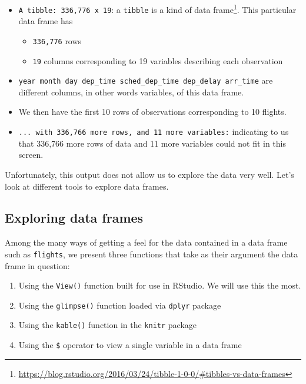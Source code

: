 \documentclass[12pt,]{krantz}
\providecommand{\tightlist}{%
  \setlength{\itemsep}{0pt}\setlength{\parskip}{0pt}}
\renewcommand{\href}[2]{#2\footnote{\url{#1}}}
\begin{document}
\begin{itemize}
\tightlist
\item
  \texttt{A\ tibble:\ 336,776\ x\ 19}: a \texttt{tibble} is a
  \href{https://blog.rstudio.org/2016/03/24/tibble-1-0-0/\#tibbles-vs-data-frames}{kind
  of data frame}. This particular data frame has

  \begin{itemize}
  \tightlist
  \item
    \texttt{336,776} rows
  \item
    \texttt{19} columns corresponding to 19 variables describing each
    observation
  \end{itemize}
\item
  \texttt{year\ month\ day\ dep\_time\ sched\_dep\_time\ dep\_delay\ arr\_time}
  are different columns, in other words variables, of this data frame.
\item
  We then have the first 10 rows of observations corresponding to 10
  flights.
\item
  \texttt{...\ with\ 336,766\ more\ rows,\ and\ 11\ more\ variables:}
  indicating to us that 336,766 more rows of data and 11 more variables
  could not fit in this screen.
\end{itemize}

Unfortunately, this output does not allow us to explore the data very
well. Let's look at different tools to explore data frames.

\subsection{Exploring data frames}\label{exploredataframes}

Among the many ways of getting a feel for the data contained in a data
frame such as \texttt{flights}, we present three functions that take as
their argument the data frame in question:

\begin{enumerate}
\def\labelenumi{\arabic{enumi}.}
\tightlist
\item
  Using the \texttt{View()} function built for use in RStudio. We will
  use this the most.
\item
  Using the \texttt{glimpse()} function loaded via \texttt{dplyr}
  package
\item
  Using the \texttt{kable()} function in the \texttt{knitr} package
\item
  Using the \texttt{\$} operator to view a single variable in a data
  frame
\end{enumerate}
\end{document}
